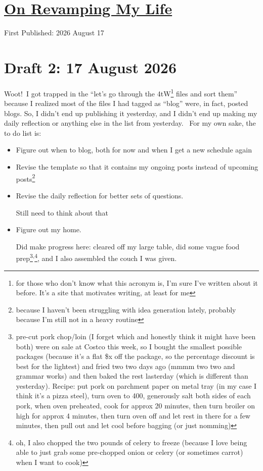 \documentclass[12pt]{article}
\newcommand{\say}[1]{``#1''}
\renewcommand{\,}{\textsuperscript{,}}
\renewcommand{\title}[2]{\section{\href{#1.html}{#2}}}
\newcommand{\published}[1]{First Published: #1}
\newcommand{\draft}[1]{\section{Draft #1}}
\begin{document}
  
\title{revamping-life}{On Revamping My Life}  
\published{2026 August 17}

\draft{2: 17 August 2026}

Woot! I got trapped in the \say{let's go through the 4tW\footnote{for those who don't know what this acronym is, I'm sure I've written about it before. It's a site that motivates writing, at least for me} files and sort them} because I realized most of the files I had tagged as \say{blog} were, in fact, posted blogs.  
So, I didn't end up publishing it yesterday, and I didn't end up making my daily reflection or anything else in the list from yesterday.   
For my own sake, the to do list is:

\begin{itemize}

\item Figure out when to blog, both for now and when I get a new schedule again  
\item Revise the template so that it contains my ongoing posts instead of upcoming posts\footnote{because I haven't been struggling with idea generation lately, probably because I'm still not in a heavy routine}  
\item Revise the daily reflection for better sets of questions.

Still need to think about that

\item Figure out my home.

Did make progress here: cleared off my large table, did some vague food prep\footnote{pre-cut pork chop/loin (I forget which and honestly think it might have been both) were on sale at Costco this week, so I bought the smallest possible packages (because it's a flat \$x off the package, so the percentage discount is best for the lightest) and fried two two days ago (mmmm two two and grammar works) and then baked the rest lasterday (which is different than yesterday). Recipe: put pork on parchment paper on metal tray (in my case I think it's a pizza steel), turn oven to 400, generously salt both sides of each pork, when oven preheated, cook for approx 20 minutes, then turn broiler on high for approx 4 minutes, then turn oven off and let rest in there for a few minutes, then pull out and let cool before bagging (or just nomming)}\,\footnote{oh, I also chopped the two pounds of celery to freeze (because I love being able to just grab some pre-chopped onion or celery (or sometimes carrot) when I want to cook)}, and I also assembled the couch I was given.


\end{itemize}
\end{document}
